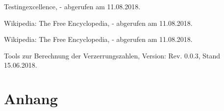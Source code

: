 \documentclass[../Report.tex]{subfiles}
\begin{document}
\begin{thebibliography}{9}
	Testingexcellence, 
	- abgerufen am 11.08.2018.
	
	Wikipedia: The Free Encyclopedia,
	- abgerufen am 11.08.2018.
	
	Wikipedia: The Free Encyclopedia,
	- abgerufen am 11.08.2018.
		
	Tools zur Berechnung der Verzerrungszahlen, 
	Version: Rev. 0.0.3, 			
	Stand 15.06.2018.
	
	
\end{thebibliography}

\chapter{Anhang}
\label{chap:anhang}
\end{document}
